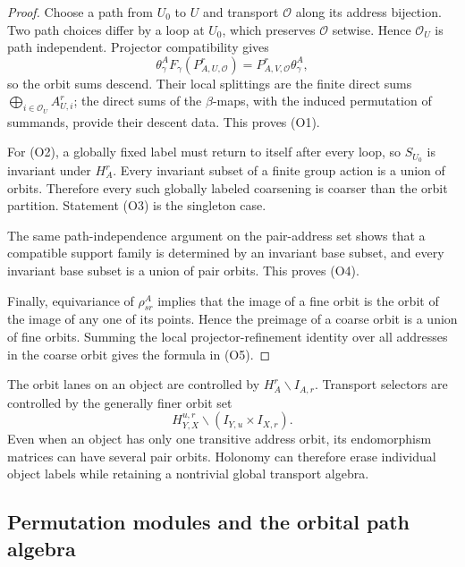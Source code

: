 \begin{proof}
Choose a path from \(U_0\) to \(U\) and transport \(\mathcal O\) along its
address bijection.  Two path choices differ by a loop at \(U_0\), which
preserves \(\mathcal O\) setwise.  Hence \(\mathcal O_U\) is path independent.
Projector compatibility gives
\[
 \theta^A_\gamma F_\gamma(P^r_{A,U,\mathcal O})
 =
 P^r_{A,V,\mathcal O}\theta^A_\gamma,
\]
so the orbit sums descend.  Their local splittings are the finite direct sums
\(\bigoplus_{i\in\mathcal O_U}A^r_{U,i}\); the direct sums of the \(\beta\)-maps,
with the induced permutation of summands, provide their descent data.  This
proves (O1).

For (O2), a globally fixed label must return to itself after every loop, so
\(S_{U_0}\) is invariant under \(H_A^r\).  Every invariant subset of a finite
group action is a union of orbits.  Therefore every such globally labeled
coarsening is coarser than the orbit partition.  Statement (O3) is the
singleton case.

The same path-independence argument on the pair-address set shows that a
compatible support family is determined by an invariant base subset, and every
invariant base subset is a union of pair orbits.  This proves (O4).

Finally, equivariance of \(\rho^A_{sr}\) implies that the image of a fine orbit
is the orbit of the image of any one of its points.  Hence the preimage of a
coarse orbit is a union of fine orbits.  Summing the local projector-refinement
identity over all addresses in the coarse orbit gives the formula in (O5).
\end{proof}

\begin{remark}
\label{rem:block16-object-vs-pair-orbits}
The orbit lanes on an object are controlled by \(H_A^r\backslash I_{A,r}\).
Transport selectors are controlled by the generally finer orbit set
\[
 H_{Y,X}^{u,r}\backslash
 \left(I_{Y,u}\times I_{X,r}\right).
\]
Even when an object has only one transitive address orbit, its endomorphism
matrices can have several pair orbits.  Holonomy can therefore erase individual
object labels while retaining a nontrivial global transport algebra.
\end{remark}

\subsection{Permutation modules and the orbital path algebra}
\label{subsec:block16-permutation-orbital-calculus}

